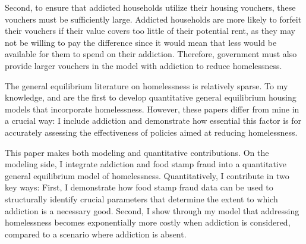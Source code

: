 \documentclass[parskip=full]{article}
\begin{document}
Second, to ensure that addicted households utilize their housing vouchers, these vouchers must be sufficiently large. Addicted households are more likely to forfeit their vouchers if their value covers too little of their potential rent, as they may not be willing to pay the difference since it would mean that less would be available for them to spend on their addiction. Therefore, government must also provide larger vouchers in the model with addiction to reduce homelessness.

The general equilibrium literature on homelessness is relatively sparse. To my knowledge, \citet{az-2024} and \citet{abramson-2024} are the first to develop quantitative general equilibrium housing models that incorporate homelessness. However, these papers differ from mine in a crucial way: I include addiction and demonstrate how essential this factor is for accurately assessing the effectiveness of policies aimed at reducing homelessness.

This paper makes both modeling and quantitative contributions. On the modeling side, I integrate addiction and food stamp fraud into a quantitative general equilibrium model of homelessness. Quantitatively, I contribute in two key ways: First, I demonstrate how food stamp fraud data can be used to structurally identify crucial parameters that determine the extent to which addiction is a necessary good. Second, I show through my model that addressing homelessness becomes exponentially more costly when addiction is considered, compared to a scenario where addiction is absent.



\end{document}
